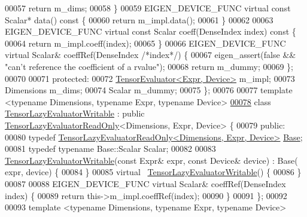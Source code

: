 \begin{DoxyCode}
00057     \textcolor{keywordflow}{return} m\_dims;
00058   \}
00059   EIGEN\_DEVICE\_FUNC \textcolor{keyword}{virtual} \textcolor{keyword}{const} Scalar* data()\textcolor{keyword}{ const }\{
00060     \textcolor{keywordflow}{return} m\_impl.data();
00061   \}
00062 
00063   EIGEN\_DEVICE\_FUNC \textcolor{keyword}{virtual} \textcolor{keyword}{const} Scalar coeff(DenseIndex index)\textcolor{keyword}{ const }\{
00064     \textcolor{keywordflow}{return} m\_impl.coeff(index);
00065   \}
00066   EIGEN\_DEVICE\_FUNC \textcolor{keyword}{virtual} Scalar& coeffRef(DenseIndex \textcolor{comment}{/*index*/}) \{
00067     eigen\_assert(\textcolor{keyword}{false} && \textcolor{stringliteral}{"can't reference the coefficient of a rvalue"});
00068     \textcolor{keywordflow}{return} m\_dummy;
00069   \};
00070 
00071  \textcolor{keyword}{protected}:
00072   \hyperlink{struct_eigen_1_1_tensor_evaluator}{TensorEvaluator<Expr, Device>} m\_impl;
00073   Dimensions m\_dims;
00074   Scalar m\_dummy;
00075 \};
00076 
00077 \textcolor{keyword}{template} <\textcolor{keyword}{typename} Dimensions, \textcolor{keyword}{typename} Expr, \textcolor{keyword}{typename} Device>
\hyperlink{class_eigen_1_1internal_1_1_tensor_lazy_evaluator_writable}{00078} \textcolor{keyword}{class }\hyperlink{class_eigen_1_1internal_1_1_tensor_lazy_evaluator_writable}{TensorLazyEvaluatorWritable} : \textcolor{keyword}{public} 
      \hyperlink{class_eigen_1_1internal_1_1_tensor_lazy_evaluator_read_only}{TensorLazyEvaluatorReadOnly}<Dimensions, Expr, Device> \{
00079  \textcolor{keyword}{public}:
00080   \textcolor{keyword}{typedef} \hyperlink{class_eigen_1_1internal_1_1_tensor_lazy_evaluator_read_only}{TensorLazyEvaluatorReadOnly<Dimensions, Expr, Device>}
       \hyperlink{class_eigen_1_1internal_1_1_tensor_lazy_evaluator_read_only}{Base};
00081   \textcolor{keyword}{typedef} \textcolor{keyword}{typename} Base::Scalar Scalar;
00082 
00083   \hyperlink{class_eigen_1_1internal_1_1_tensor_lazy_evaluator_writable}{TensorLazyEvaluatorWritable}(\textcolor{keyword}{const} Expr& expr, \textcolor{keyword}{const} Device& device) : Base(
      expr, device) \{
00084   \}
00085   \textcolor{keyword}{virtual} ~\hyperlink{class_eigen_1_1internal_1_1_tensor_lazy_evaluator_writable}{TensorLazyEvaluatorWritable}() \{
00086   \}
00087 
00088   EIGEN\_DEVICE\_FUNC \textcolor{keyword}{virtual} Scalar& coeffRef(DenseIndex index) \{
00089     \textcolor{keywordflow}{return} this->m\_impl.coeffRef(index);
00090   \}
00091 \};
00092 
00093 \textcolor{keyword}{template} <\textcolor{keyword}{typename} Dimensions, \textcolor{keyword}{typename} Expr, \textcolor{keyword}{typename} Device>

\end{DoxyCode}
